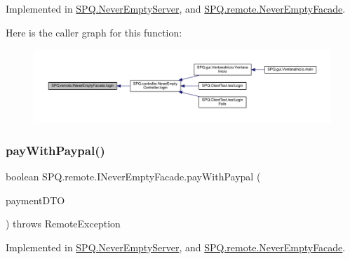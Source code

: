 Implemented in \mbox{\hyperlink{class_s_p_q_1_1_never_empty_server_a79e3b01cc25be204f24e01c7fccbef13}{S\+P\+Q.\+Never\+Empty\+Server}}, and \mbox{\hyperlink{class_s_p_q_1_1remote_1_1_never_empty_facade_a3fdd96efa1256ea520a497b8a20578e8}{S\+P\+Q.\+remote.\+Never\+Empty\+Facade}}.

Here is the caller graph for this function\+:\nopagebreak
\begin{figure}[H]
\begin{center}
\leavevmode
\includegraphics[width=350pt]{interface_s_p_q_1_1remote_1_1_i_never_empty_facade_a2440fa36695c63e4e4c30fc25965f853_icgraph}
\end{center}
\end{figure}
\mbox{\label{interface_s_p_q_1_1remote_1_1_i_never_empty_facade_a2d34c64f91537d8c7138094e418de785}} 
\subsubsection{\texorpdfstring{pay\+With\+Paypal()}{payWithPaypal()}}
{\footnotesize\ttfamily boolean S\+P\+Q.\+remote.\+I\+Never\+Empty\+Facade.\+pay\+With\+Paypal (\begin{DoxyParamCaption}\item[{\mbox{\hyperlink{class_s_p_q_1_1dto_1_1_payment_d_t_o}{Payment\+D\+TO}}}]{payment\+D\+TO }\end{DoxyParamCaption}) throws Remote\+Exception}



Implemented in \mbox{\hyperlink{class_s_p_q_1_1_never_empty_server_a954ea8c563055eae79564b357e557f85}{S\+P\+Q.\+Never\+Empty\+Server}}, and \mbox{\hyperlink{class_s_p_q_1_1remote_1_1_never_empty_facade_a9942c7930b5144f0677dc0fdcde25cc3}{S\+P\+Q.\+remote.\+Never\+Empty\+Facade}}.

